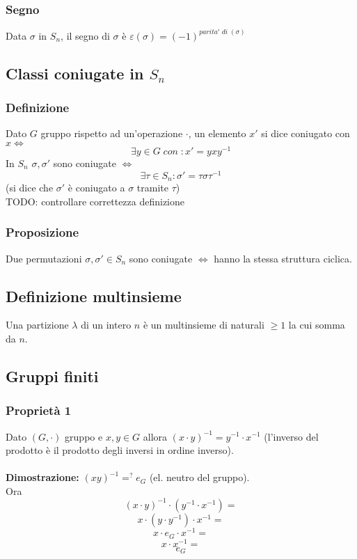 \subsubsection{Segno}

Data \(\sigma\) in \(S_n\), il segno di \(\sigma\) è \(\varepsilon (\sigma)=(-1)^{parita'\;di\;(\sigma)}\)

\subsection{Classi coniugate in \(S_n\)}

\subsubsection{Definizione}
Dato \(G\) gruppo rispetto ad un'operazione \(\cdot\), un elemento \(x'\) si dice coniugato con \(x\Leftrightarrow\)
\[\exists y\in G\;con\;:x'=yxy^{-1}\] 
In \(S_n\) \(\sigma ,\sigma '\) sono coniugate \(\Leftrightarrow\)
\[\exists\tau\in S_n: \sigma '=\tau\sigma\tau ^{-1}\]
(si dice che \(\sigma'\) è coniugato a \(\sigma\) tramite \(\tau\)) %
\\TODO: controllare correttezza definizione

\subsubsection{Proposizione}
Due permutazioni \(\sigma, \sigma '\in S_n\) sono coniugate \(\Leftrightarrow\) hanno la stessa struttura ciclica.

\subsection{Definizione multinsieme}
Una partizione \(\lambda\) di un intero \(n\) è un multinsieme di naturali \(\geq 1\) la cui somma da \(n\).

\subsection{Gruppi finiti}

\subsubsection{Proprietà 1}

Dato \((G,\cdot)\) gruppo e \(x,y\in G\) allora \((x\cdot y)^{-1}=y^{-1}\cdot x^{-1}\) (l'inverso del prodotto è il prodotto degli inversi in ordine inverso).
\\\\
\textbf{Dimostrazione:} \((xy)^{-1}=^? e_G\) (el. neutro del gruppo).
\\Ora 
\[(x\cdot y)^{-1}\cdot (y^{-1}\cdot x^{-1})=\]
\[x\cdot (y\cdot y^{-1})\cdot x^{-1}=\]
\[x\cdot e_G\cdot x^{-1}=\]
\[x\cdot x^{-1}=\]
\[e_G\]

